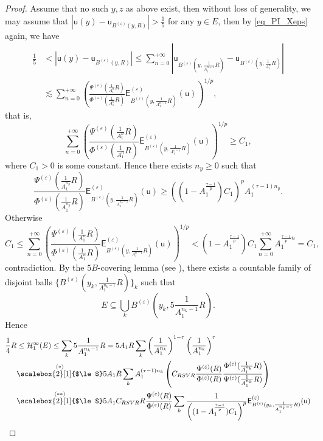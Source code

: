 \documentclass[11pt,a4paper]{article}
\numberwithin{equation}{section}
\theoremstyle{plain}
\theoremstyle{definition}
\begin{document}
\begin{proof}
Assume that no such $y,z$ as above exist, then without loss of generality, we may assume that $|\mathsf{u}(y)-\mathsf{u}_{B^{(\varepsilon)}(y,R)}|>\frac{1}{5}$ for any $y\in E$, then by \ref{eq_PI_Xeps} again, we have
\begin{align*}
\frac{1}{5}&<|\mathsf{u}(y)-\mathsf{u}_{B^{(\varepsilon)}(y,R)}|\le\sum_{n=0}^{+\infty}|\mathsf{u}_{B^{(\varepsilon)}(y,\frac{1}{A_1^{n+1}}R)}-\mathsf{u}_{B^{(\varepsilon)}(y,\frac{1}{A_1^{n}}R)}|\\
&\lesssim\sum_{n=0}^{+\infty}\left(\frac{\Psi^{(\varepsilon)}(\frac{1}{A_1^{n}}R)}{\Phi^{(\varepsilon)}(\frac{1}{A_1^{n}}R)}\mathsf{E}^{(\varepsilon)}_{B^{(\varepsilon)}(y,\frac{1}{A_1^{n-1}}R)}(\mathsf{u})\right)^{1/p},
\end{align*}
that is,
$$\sum_{n=0}^{+\infty}\left(\frac{\Psi^{(\varepsilon)}(\frac{1}{A_1^{n}}R)}{\Phi^{(\varepsilon)}(\frac{1}{A_1^{n}}R)}\mathsf{E}^{(\varepsilon)}_{B^{(\varepsilon)}(y,\frac{1}{A_1^{n-1}}R)}(\mathsf{u})\right)^{1/p}\ge C_1,$$
where $C_1>0$ is some constant. Hence there exists $n_y\ge0$ such that
\begin{equation}\label{eq_lcap_RSVR}
\frac{\Psi^{(\varepsilon)}(\frac{1}{A_1^{n_y}}R)}{\Phi^{(\varepsilon)}(\frac{1}{A_1^{n_y}}R)}\mathsf{E}^{(\varepsilon)}_{B^{(\varepsilon)}(y,\frac{1}{A_1^{n_y-1}}R)}(\mathsf{u})\ge \left((1-A_1^{\frac{\tau-1}{p}})C_1\right)^pA_1^{(\tau-1)n_y}.
\end{equation}
Otherwise
$$C_1\le\sum_{n=0}^{+\infty}\left(\frac{\Psi^{(\varepsilon)}(\frac{1}{A_1^{n}}R)}{\Phi^{(\varepsilon)}(\frac{1}{A_1^{n}}R)}\mathsf{E}^{(\varepsilon)}_{B^{(\varepsilon)}(y,\frac{1}{A_1^{n-1}}R)}(\mathsf{u})\right)^{1/p}<(1-A_1^{\frac{\tau-1}{p}})C_1\sum_{n=0}^{+\infty}A_1^{\frac{\tau-1}{p}n}=C_1,$$
contradiction. By the $5B$-covering lemma (see \cite[Theorem 1.2]{Hei01}), there exists a countable family of disjoint balls $\{B^{(\varepsilon)}(y_k,\frac{1}{A_1^{n_k-1}}R)\}_k$ such that
$$E\subseteq\bigcup_kB^{(\varepsilon)}(y_k,5\frac{1}{A_1^{n_k-1}}R).$$
Hence
\begin{align*}
\frac{1}{4}R&\le\mathcal{H}_1^\infty(E)\le\sum_k5\frac{1}{A_1^{n_k-1}}R=5A_1R\sum_k\left(\frac{1}{A_1^{n_k}}\right)^{1-\tau}\left(\frac{1}{A_1^{n_k}}\right)^\tau\\
&\overset{(*)}{\scalebox{2}[1]{$\le$}}5A_1R\sum_kA_1^{(\tau-1)n_k}\left(C_{RSVR}\frac{\Psi^{(\varepsilon)}(R)}{\Phi^{(\varepsilon)}(R)}\frac{\Phi^{(\varepsilon)}(\frac{1}{A_1^{n_k}}R)}{\Psi^{(\varepsilon)}(\frac{1}{A_1^{n_k}}R)}\right)\\
&\overset{(**)}{\scalebox{2}[1]{$\le$}}5A_1C_{RSVR}R\frac{\Psi^{(\varepsilon)}(R)}{\Phi^{(\varepsilon)}(R)}\sum_k \frac{1}{\left((1-A_1^{{\frac{\tau-1}{p}}})C_1\right)^p}\mathsf{E}^{(\varepsilon)}_{B^{(\varepsilon)}(y_k,\frac{1}{A_1^{n_k-1}}R)}(\mathsf{u})\\

\end{align*}
\end{proof}
\end{document}
